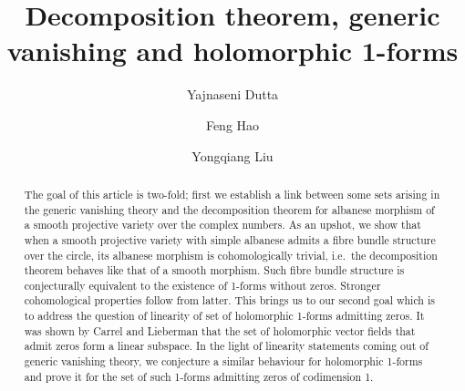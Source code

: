 \documentclass[12pt,reqno]{amsart}
\title{}
\theoremstyle{question}
\theoremstyle{definition}
\theoremstyle{remark}
\theoremstyle{cited}
\theoremstyle{citeddef}
\begin{document}
  
\title[Decomposition theorem, generic vanishing and holomorphic 1-forms]{Decomposition theorem, generic vanishing and holomorphic 1-forms} 

\author{Yajnaseni Dutta}


\author{Feng Hao}


\author{Yongqiang Liu}






\begin{abstract} 
The goal of this article is two-fold; first we establish a link
between some sets arising in the generic vanishing theory and
the decomposition theorem for albanese morphism of a smooth projective variety over the complex numbers. As an upshot, we show that when a smooth projective variety with simple albanese admits a fibre bundle structure over the circle, its albanese morphism is cohomologically trivial, i.e.\ the decomposition theorem behaves like that of a smooth morphism. Such fibre bundle structure is conjecturally equivalent to the existence of 1-forms without zeros. Stronger cohomological properties follow from latter. This brings us to our second goal which is to address the question of linearity of set of holomorphic 1-forms
admitting zeros. It was shown by Carrel and Lieberman that the set of holomorphic vector fields that admit zeros form a linear subspace. In the light of linearity statements coming out of generic vanishing theory, we conjecture a similar behaviour for holomorphic 1-forms and prove it for the set
of such 1-forms admitting zeros of codimension 1. 
\end{abstract}

\maketitle
\tableofcontents
\end{document}
